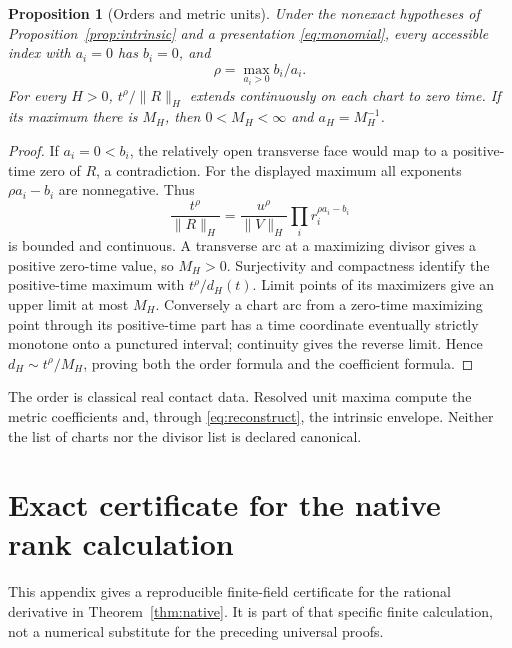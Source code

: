 \documentclass[11pt,reqno]{amsart}
\numberwithin{equation}{section}
\newtheorem{proposition}[theorem]{Proposition}
\theoremstyle{definition}
\theoremstyle{remark}
\begin{document}
\begin{proposition}[Orders and metric units]\label{prop:order}
Under the nonexact hypotheses of Proposition~\ref{prop:intrinsic} and a presentation \eqref{eq:monomial}, every accessible index with $a_i=0$ has $b_i=0$, and
\[
 \rho=\max_{a_i>0}b_i/a_i.
\]
For every $H>0$, $t^\rho/\|R\|_H$ extends continuously on each chart to zero time. If its maximum there is $M_H$, then $0<M_H<\infty$ and $a_H=M_H^{-1}$.
\end{proposition}
\begin{proof}
If $a_i=0<b_i$, the relatively open transverse face would map to a positive-time zero of $R$, a contradiction. For the displayed maximum all exponents $\rho a_i-b_i$ are nonnegative. Thus
\[
 \frac{t^\rho}{\|R\|_H}=\frac{u^\rho}{\|V\|_H}\prod_i r_i^{\rho a_i-b_i}
\]
is bounded and continuous. A transverse arc at a maximizing divisor gives a positive zero-time value, so $M_H>0$. Surjectivity and compactness identify the positive-time maximum with $t^\rho/d_H(t)$. Limit points of its maximizers give an upper limit at most $M_H$. Conversely a chart arc from a zero-time maximizing point through its positive-time part has a time coordinate eventually strictly monotone onto a punctured interval; continuity gives the reverse limit. Hence $d_H\sim t^\rho/M_H$, proving both the order formula and the coefficient formula.
\end{proof}
The order is classical real contact data. Resolved unit maxima compute the metric coefficients and, through \eqref{eq:reconstruct}, the intrinsic envelope. Neither the list of charts nor the divisor list is declared canonical.

\section{Exact certificate for the native rank calculation}\label{app:certificate}
This appendix gives a reproducible finite-field certificate for the rational derivative in Theorem~\ref{thm:native}. It is part of that specific finite calculation, not a numerical substitute for the preceding universal proofs.
\end{document}
